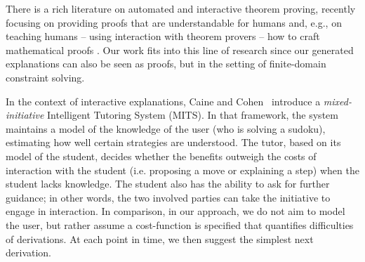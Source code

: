 

There is a rich literature on automated and interactive theorem proving, recently focusing on providing proofs that are understandable for humans \cite{Ganesalingam2017} and, e.g.,  on teaching humans -- using interaction with theorem provers -- how to craft mathematical proofs \cite{DBLP:conf/icml/YangD19}.
Our work fits into this line of research since our generated explanations can also be seen as proofs, but in the setting of finite-domain constraint solving. 

In the context of interactive explanations, Caine and Cohen~\cite{caine2006mits} introduce a \emph{mixed-initiative} Intelligent Tutoring System (MITS). 
In that framework, the system maintains a model of the knowledge of the user (who is solving a sudoku), estimating how well certain strategies are understood. 
The tutor, based on its model of the student, decides whether the benefits outweigh the costs of interaction with the student (i.e. proposing a move or explaining a step) when the student lacks knowledge. The student also has the ability to ask for further guidance; in other words, the two involved parties can take the initiative to engage in interaction. In comparison, in our approach, we do not aim to model the user, but rather assume a cost-function is specified that quantifies difficulties of derivations. At each point in time, we then suggest the simplest next derivation.


